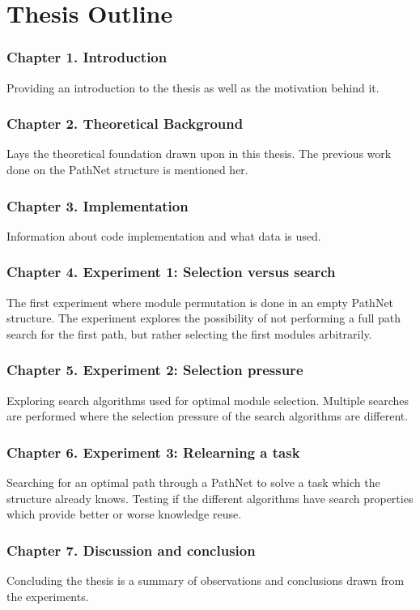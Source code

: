 \section{Thesis Outline}
\subsubsection{Chapter 1. Introduction}
Providing an introduction to the thesis as well as the motivation behind it.
\subsubsection{Chapter 2. Theoretical Background}
Lays the theoretical foundation drawn upon in this thesis. The previous work done on the PathNet structure is mentioned her.
\subsubsection{Chapter 3. Implementation}
Information about code implementation and what data is used.
\subsubsection{Chapter 4. Experiment 1: Selection versus search}
The first experiment where module permutation is done in an empty PathNet structure. The experiment explores the possibility of not performing a full path search for the first path, but rather selecting the first modules arbitrarily.
\subsubsection{Chapter 5. Experiment 2: Selection pressure}
Exploring search algorithms used for optimal module selection. Multiple searches are performed where the selection pressure of the search algorithms are different. 
\subsubsection{Chapter 6. Experiment 3: Relearning a task}
Searching for an optimal path through a PathNet to solve a task which the structure already knows. Testing if the different algorithms have search properties which provide better or worse knowledge reuse.
\subsubsection{Chapter 7. Discussion and conclusion}
Concluding the thesis is a summary of observations and conclusions drawn from the experiments.

